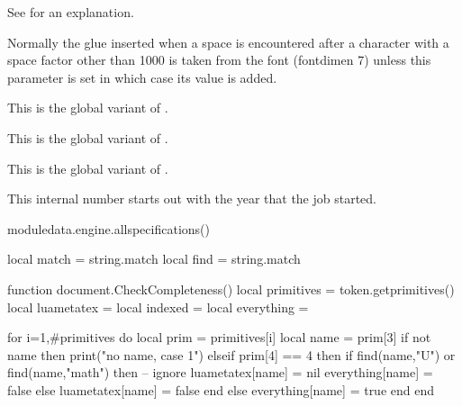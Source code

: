 \startoldprimitive[title={\prm {xleaders}}]

See  for an explanation.

\stopoldprimitive

\startoldprimitive[title={\prm {xspaceskip}}]

Normally the glue inserted when a space is encountered after a character with a
space factor other than 1000 is taken from the font (fontdimen 7) unless this
parameter is set in which case its value is added.

\stopoldprimitive

\startnewprimitive[title={\prm {xtoks}}]

This is the global variant of .

\stopnewprimitive

\startnewprimitive[title={\prm {xtoksapp}}]

This is the global variant of .

\stopnewprimitive

\startnewprimitive[title={\prm {xtokspre}}]

This is the global variant of .

\stopnewprimitive

\startoldprimitive[title={\prm {year}}]

This internal number starts out with the year that the job started.

\stopoldprimitive

\stopsection

\page

\startsection[title=Syntax]

\startpagecolumns[page=no]
    \startluacode
        moduledata.engine.allspecifications()
    \stopluacode
\stoppagecolumns

\stopsection

\page

\startluacode
    local match = string.match
    local find  = string.match

    function document.CheckCompleteness()
        local primitives = token.getprimitives()
        local luametatex = { }
        local indexed    = { }
        local everything = { }

        for i=1,#primitives do
            local prim = primitives[i]
            local name = prim[3]
            if not name then
                print("no name, case 1")
            elseif prim[4] == 4 then
                if find(name,"U") or find(name,"math") then
                    -- ignore
                    luametatex[name] = nil
                    everything[name] = false
                else
                    luametatex[name] = false
                end
            else
                everything[name] = true
            end
        end

